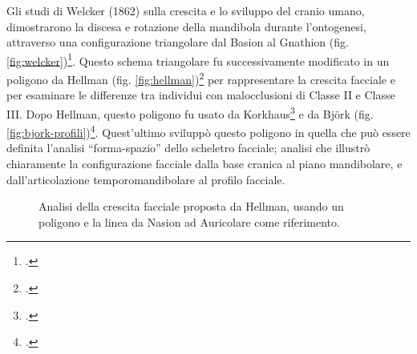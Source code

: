 Gli studi di Welcker (1862) sulla crescita e lo sviluppo del cranio umano, dimostrarono la discesa e rotazione della mandibola durante l'ontogenesi, attraverso una configurazione triangolare dal Basion al Gnathion (fig. \vref{fig:welcker})\footcite{Welcker1866}. Questo schema triangolare fu successivamente modificato in un poligono da Hellman (fig. \vref{fig:hellman})\footcite{Hellman1935} per rappresentare la crescita facciale e per esaminare le differenze tra individui con malocclusioni di Classe II e Classe III. Dopo Hellman, questo poligono fu usato da Korkhaus\footcite{Korkhaus1939} e da Björk (fig. \vref{fig:bjork-profili})\footcite{Bjoerk1947}. Quest'ultimo sviluppò questo poligono in quella che può essere definita l'analisi ``forma-spazio'' dello scheletro facciale; analisi che illustrò chiaramente la configurazione facciale dalla base cranica al piano mandibolare, e dall'articolazione temporomandibolare al profilo facciale.

\begin{figure}
\centering
{}
\caption{Analisi della crescita facciale proposta da Hellman, usando un poligono e la linea da Nasion ad Auricolare come riferimento.}
\label{fig:hellman}
\end{figure}

